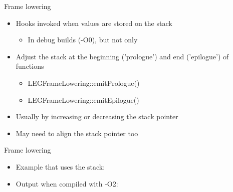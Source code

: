 
\begin{frame}{Frame lowering}

\begin{itemize}
    \item Hooks invoked when values are stored on the stack
    \begin{itemize}
        \item In debug builds (-O0), but not only
    \end{itemize}
    \item Adjust the stack at the beginning ('prologue') and end ('epilogue') of functions
    \begin{itemize}
        \item LEGFrameLowering::emitPrologue()
        \item LEGFrameLowering::emitEpilogue()
    \end{itemize}
    \item Usually by increasing or decreasing the stack pointer
    \item May need to align the stack pointer too
\end{itemize}

\end{frame}


\begin{frame}{Frame lowering}

\begin{itemize}
    \item Example that uses the stack:
\end{itemize}


\begin{itemize}
    \item Output when compiled with -O2:
\end{itemize}


\end{frame}



